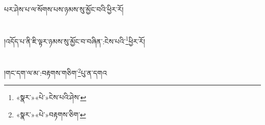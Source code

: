 པར་ཤེས་པ་ལ་སོགས་པས་ཉམས་སུ་མྱོང་བའི་ཕྱིར་རོ།\chapter{ }།འདོད་པ་ནི་ཇི་ལྟར་ཉམས་སུ་མྱོང་བ་བཞིན་:ངེས་པའི་\footnote{«སྣར་»«པེ་»ངེས་པའི་ཤེས་}ཕྱིར་རོ།\chapter{ }།གང་དག་ལ་མ་:བརྟགས་གཅིག་\footnote{«སྣར་»«པེ་»བརྟགས་ཅིག་}པུ་ན་དགའ